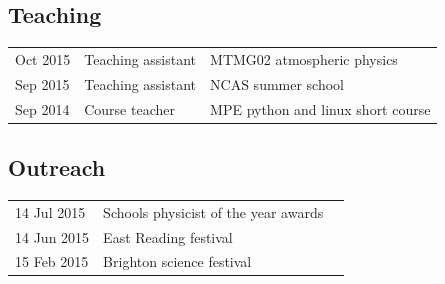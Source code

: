 \documentclass[a4paper,11pt]{article}
\begin{document}
{\subsection*{Teaching}
\begin{tabular}{l l l}
Oct 2015 & Teaching assistant & MTMG02 atmospheric physics \\
Sep 2015 & Teaching assistant & NCAS summer school \\
Sep 2014 & Course teacher & MPE python and linux short course \\
\end{tabular}

\subsection*{Outreach}
\begin{tabular}{l l l}
14 Jul 2015 & Schools physicist of the year awards \\
14 Jun 2015 & East Reading festival \\
15 Feb 2015 & Brighton science festival \\
\end{tabular}
}

                                                 
\small{}
\end{document}
